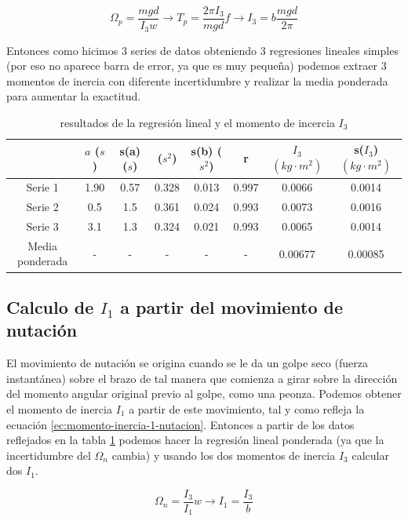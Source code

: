 \documentclass[12pt,a4paper]{article}
\begin{document}
\begin{equation}
\Omega_p=\dfrac{mgd}{I_3 w}  \longrightarrow T_p = \dfrac{2 \pi I_3}{m g d} f \longrightarrow I_3 = b \dfrac{mgd}{2 \pi} 
\label{ec:I3-precesion}
\end{equation}


Entonces como hicimos 3 series de datos obteniendo 3 regresiones lineales simples (por eso no aparece barra de error, ya que es muy pequeña) podemos extraer 3 momentos de inercia con diferente incertidumbre y realizar la media ponderada para aumentar la exactitud.

\begin{table}[h!] \centering 
\begin{tabular}{|c|c|c|c|c|c||c|c|} 
\hline  	 & $ a $  ($s$)	 & s(a) ($s$)	 & 	($s^2$) & s(b) ($s^2$)	 & r 	 & $I_3$  $(kg \cdot m^2)$	 & s($I_3$) 	$(kg \cdot m^2)$ \\ 
\hline Serie 1 	 & 1.90 	 & 0.57 	 & 0.328 	 & 0.013 	 & 0.997  & 0.0066 	 & 0.0014 \\ 
Serie 2 	 & 0.5 	 & 1.5	 & 0.361	 & 0.024	 & 0.993 	 & 0.0073 	 & 0.0016 \\ 
Serie 3 	 & 3.1 	 & 1.3	 & 0.324 	 & 0.021 	 & 0.993 	 & 0.0065 	 & 0.0014 \\ 
Media ponderada 	 & - 	 & - 	 & - 	 & - 	 & - 	 & 0.00677 	 & 0.00085 \\ 
\hline 
 \end{tabular} 
\caption{resultados de la regresión lineal y el momento de incercia $I_3$} 
\label{tab:culo}
\end{table} 


\subsection{Calculo de $I_1$ a partir del movimiento de nutación}

El movimiento de nutación se origina cuando se le da un golpe seco (fuerza instantánea) sobre el brazo de tal manera que comienza a girar sobre la dirección del momento angular original previo al golpe, como una peonza. Podemos obtener el momento de inercia $I_1$ a partir de este movimiento, tal y como refleja la ecuación \ref{ec:momento-inercia-1-nutacion}. Entonces a partir de los datos reflejados en la tabla \ref{tab:culo} podemos hacer la regresión lineal ponderada (ya que la incertidumbre del $\Omega_n$ cambia) y usando los dos momentos de inercia $I_3$ calcular dos $I_1$.


\begin{equation}
\Omega_n = \dfrac{I_3}{I_1}w  \longrightarrow I_1= \dfrac{I_3}{b} \label{ec:momento-inercia-1-nutacion}
\end{equation}
\end{document}
